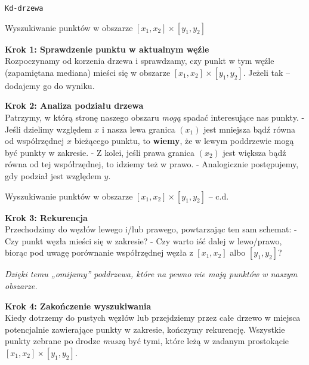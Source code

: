 \documentclass[aspectratio=1610, polish]{beamer}
\begin{document}
\begin{section}{\texttt{Kd-drzewa}}
\begin{frame}{Wyszukiwanie punktów w obszarze \([x_1, x_2] \times [y_1, y_2]\)}

\begin{mdframed}
\textbf{Krok 1: Sprawdzenie punktu w aktualnym węźle}\\[3pt]
Rozpoczynamy od korzenia drzewa i sprawdzamy, czy punkt w tym węźle
(zapamiętana mediana) mieści się w obszarze \([x_1, x_2] \times [y_1, y_2]\).
Jeżeli tak – dodajemy go do wyniku.
\end{mdframed}

\begin{mdframed}
\textbf{Krok 2: Analiza podziału drzewa} \\[3pt]
Patrzymy, w którą stronę naszego obszaru \textit{mogą} spadać interesujące nas punkty.
- Jeśli dzielimy względem \(x\) i nasza lewa granica \((x_1)\) jest mniejsza bądź równa od współrzędnej \(x\) bieżącego punktu,
  to \textbf{wiemy}, że w lewym poddrzewie mogą być punkty w zakresie.  
- Z kolei, jeśli prawa granica \((x_2)\) jest większa bądź równa od tej współrzędnej,
  to idziemy też w prawo.
- Analogicznie postępujemy, gdy podział jest względem \(y\).
\end{mdframed}

\end{frame}
\begin{frame}{Wyszukiwanie punktów w obszarze \([x_1, x_2] \times [y_1, y_2]\) -- c.d.}
\begin{mdframed}
\textbf{Krok 3: Rekurencja} \\[3pt]
Przechodzimy do węzłów lewego i/lub prawego, powtarzając ten sam schemat:
- Czy punkt węzła mieści się w zakresie?
- Czy warto iść dalej w lewo/prawo, biorąc pod uwagę porównanie
  współrzędnej węzła z \([x_1, x_2]\) albo \([y_1, y_2]\)?

\textit{Dzięki temu „omijamy” poddrzewa, które na pewno nie mają punktów w naszym obszarze.}
\end{mdframed}

\begin{mdframed}
\textbf{Krok 4: Zakończenie wyszukiwania}\\[3pt]
Kiedy dotrzemy do pustych węzłów lub przejdziemy przez całe drzewo w miejsca
potencjalnie zawierające punkty w zakresie, kończymy rekurencję.  
Wszystkie punkty zebrane po drodze \emph{muszą} być tymi, które leżą
w zadanym prostokącie \([x_1, x_2] \times [y_1, y_2]\).
\end{mdframed}


\end{frame}
\end{section}
\end{document}
